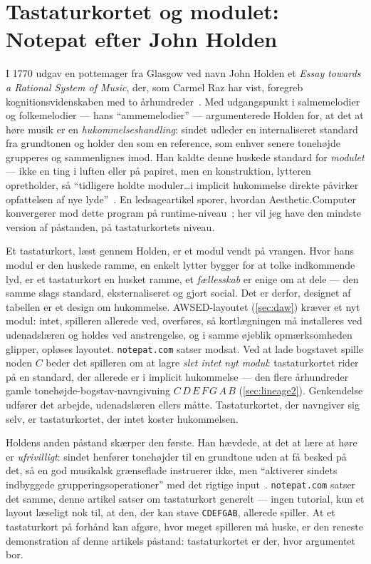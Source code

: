 \documentclass[10pt,letterpaper,twocolumn]{article}
\newcommand{\acdot}{{\color{acpink}.}}
\newcommand{\ac}{Aesthetic{\acdot}Computer}
\DeclareRobustCommand{\key}[1]{\tikz[baseline=(k.base)]{%
 \node[fill=keystroke, rounded corners=1.3pt, inner xsep=2.4pt,
    inner ysep=1.9pt, anchor=base, yshift=-1.2pt] at (0,0)
  {\footnotesize\ttfamily\bfseries\vphantom{A}\phantom{#1}};
 \node[draw=keystroke, line width=0.4pt, fill=keyfill,
    rounded corners=1.3pt, inner xsep=2.4pt, inner ysep=1.9pt,
    anchor=base] (k) at (0,0)
  {\footnotesize\ttfamily\bfseries\vphantom{A}#1};}}
\begin{document}
\appendix
\renewcommand{\thesection}{Appendiks~\Alph{section}}

\section{Tastaturkortet og modulet: Notepat efter John Holden}
\label{app:holden}

I 1770 udgav en pottemager fra Glasgow ved navn John Holden et \emph{Essay towards a Rational System of Music}, der, som Carmel Raz har vist, foregreb kognitionsvidenskaben med to århundreder~\citep{holden1770,raz2025}. Med udgangspunkt i salmemelodier og folkemelodier --- hans ``ammemelodier'' --- argumenterede Holden for, at det at høre musik er en \emph{hukommelseshandling}: sindet udleder en internaliseret standard fra grundtonen og holder den som en reference, som enhver senere tonehøjde grupperes og sammenlignes imod. Han kaldte denne huskede standard for \emph{modulet} --- ikke en ting i luften eller på papiret, men en konstruktion, lytteren opretholder, så ``tidligere holdte moduler\ldots i implicit hukommelse direkte påvirker opfattelsen af nye lyde''~\citep{raz2025}. En ledsageartikel sporer, hvordan \ac{} konvergerer mod dette program på runtime-niveau~\citep{scudder2026holden}; her vil jeg have den mindste version af påstanden, på tastaturkortets niveau.

Et tastaturkort, læst gennem Holden, er et modul vendt på vrangen. Hvor hans modul er den huskede ramme, en enkelt lytter bygger for at tolke indkommende lyd, er et tastaturkort en husket ramme, et \emph{fællesskab} er enige om at dele --- den samme slags standard, eksternaliseret og gjort social. Det er derfor, designet af tabellen er et design om hukommelse. AWSED-layoutet (\textsection\ref{sec:daw}) kræver et nyt modul: intet, spilleren allerede ved, overføres, så kortlægningen må installeres ved udenadslæren og holdes ved anstrengelse, og i samme øjeblik opmærksomheden glipper, opløses layoutet. \texttt{notepat.com} satser modsat. Ved at lade bogstavet \key{C} spille noden $C$ beder det spilleren om at lagre \emph{slet intet nyt modul}: tastaturkortet rider på en standard, der allerede er i implicit hukommelse --- den flere århundreder gamle tonehøjde-bogstav-navngivning $C\,D\,E\,F\,G\,A\,B$ (\textsection\ref{sec:lineage2}). Genkendelse udfører det arbejde, udenadslæren ellers måtte. Tastaturkortet, der navngiver sig selv, er tastaturkortet, der intet koster hukommelsen.

Holdens anden påstand skærper den første. Han hævdede, at det at lære at høre er \emph{ufrivilligt}: sindet henfører tonehøjder til en grundtone uden at få besked på det, så en god musikalsk grænseflade instruerer ikke, men ``aktiverer sindets indbyggede grupperingsoperationer'' med det rigtige input~\citep{raz2025}. \texttt{notepat.com} satser det samme, denne artikel satser om tastaturkort generelt --- ingen tutorial, kun et layout læseligt nok til, at den, der kan stave \texttt{CDEFGAB}, allerede spiller. At et tastaturkort på forhånd kan afgøre, hvor meget spilleren må huske, er den reneste demonstration af denne artikels påstand: tastaturkortet er der, hvor argumentet bor.
\end{document}
